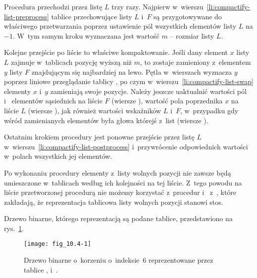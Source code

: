 Procedura przechodzi przez listę $L$ trzy razy. Najpierw w~wierszu~\ref{li:compactify-list-preprocess} tablice przechowujące listy $L$ i~$F$ są przygotowywane do właściwego przetwarzania poprzez ustawienie pól  wszystkich elementów listy $L$ na $-1$. W~tym samym kroku wyznaczana jest wartość $m$ -- rozmiar listy $L$.

Kolejne przejście po liście to właściwe kompaktowanie. Jeśli dany element $x$ listy $L$ zajmuje w~tablicach pozycję wyższą niż $m$, to zostaje zamieniony z~elementem $y$ listy $F$ znajdującym się najbardziej na lewo. Pętla  w~wierszach \doubledash{\ref{li:compactify-list-while2-begin}}{\ref{li:compactify-list-while2-end}} wyznacza $y$ poprzez liniowe przeglądanie tablicy , po czym w~wierszu~\ref{li:compactify-list-swap} elementy $x$ i~$y$ zamieniają swoje pozycje. Należy jeszcze uaktualnić wartości pól  i~ elementów sąsiednich na liście $F$ (wiersze \doubledash{\ref{li:compactify-list-fix-neighbors-begin}}{\ref{li:compactify-list-fix-neighbors-end}}), wartość pola  poprzednika $x$ na liście $L$ (wiersze \doubledash{\ref{li:compactify-list-fix-predecessor-begin}}{\ref{li:compactify-list-fix-predecessor-end}}), jak również wartości wskaźników $L$ i~$F$, w~przypadku gdy wśród zamienianych elementów była głowa którejś z~list (wiersze \doubledash{\ref{li:compactify-list-fix-heads-begin}}{\ref{li:compactify-list-fix-heads-end}}).

Ostatnim krokiem procedury jest ponowne przejście przez listę $L$ w~wierszu~\ref{li:compactify-list-postprocess} i~przywrócenie odpowiednich wartości w~polach  wszystkich jej elementów.

Po wykonaniu procedury elementy z~listy wolnych pozycji nie zawsze będą umieszczone w~tablicach według ich kolejności na tej liście. Z~tego powodu na liście przetworzonej procedurą  nie możemy korzystać z~procedur  i~ z~, które zakładają, że reprezentacja tablicowa listy wolnych pozycji stanowi stos.


\exercise %
Drzewo binarne, którego reprezentacją są podane tablice, przedstawiono na rys.~\ref{fig:10.4-1}.
\begin{figure}[ht]
	\begin{center}
		\texttt{[image: fig\_10.4-1]}
	\end{center}
	\caption{Drzewo binarne o~korzeniu o~indeksie~6 reprezentowane przez tablice ,  i~.} \label{fig:10.4-1}
\end{figure}


